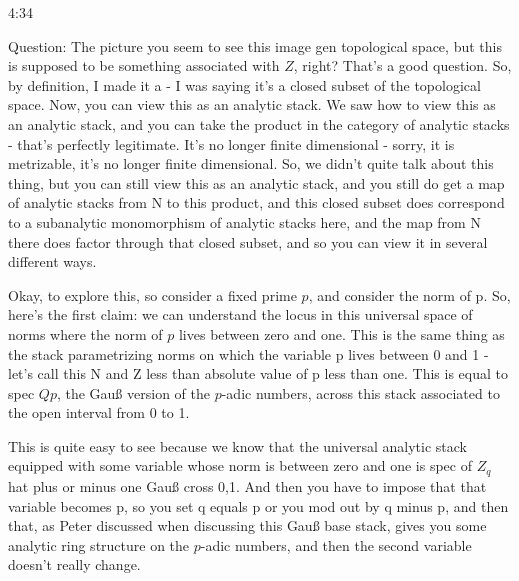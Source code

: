 \begin{unfinished}{4:34}
\begin{example}
\begin{example}
\begin{example}
Question: The picture you seem to see this image gen topological space, but this is supposed to be something associated with $Z$, right? That's a good question. So, by definition, I made it a - I was saying it's a closed subset of the topological space. Now, you can view this as an analytic stack. We saw how to view this as an analytic stack, and you can take the product in the category of analytic stacks - that's perfectly legitimate. It's no longer finite dimensional - sorry, it is metrizable, it's no longer finite dimensional. So, we didn't quite talk about this thing, but you can still view this as an analytic stack, and you still do get a map of analytic stacks from N to this product, and this closed subset does correspond to a subanalytic monomorphism of analytic stacks here, and the map from N there does factor through that closed subset, and so you can view it in several different ways.

Okay, to explore this, so consider a fixed prime $p$, and consider the norm of p. So, here's the first claim: we can understand the locus in this universal space of norms where the norm of $p$ lives between zero and one. This is the same thing as the stack parametrizing norms on which the variable p lives between 0 and 1 - let's call this N and Z less than absolute value of p less than one. This is equal to spec $Qp$, the Gauß version of the $p$-adic numbers, across this stack associated to the open interval from 0 to 1.

This is quite easy to see because we know that the universal analytic stack equipped with some variable whose norm is between zero and one is spec of $Z_q$ hat plus or minus one Gauß cross 0,1. And then you have to impose that that variable becomes p, so you set q equals p or you mod out by q minus p, and then that, as Peter discussed when discussing this Gauß base stack, gives you some analytic ring structure on the $p$-adic numbers, and then the second variable doesn't really change.


\end{example}
\end{example}
\end{example}
\end{unfinished}
